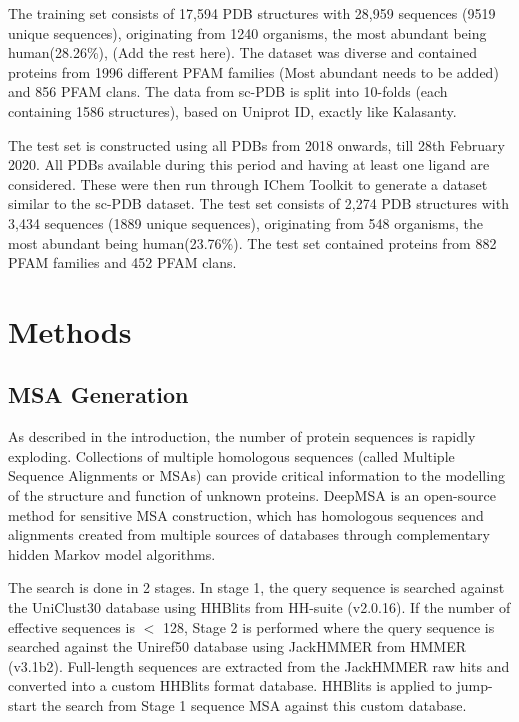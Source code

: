 \documentclass[journal=jacsat,manuscript=article]{achemso}
\begin{document}
The training set consists of 17,594 PDB structures with 28,959 sequences (9519 unique sequences), originating from 1240 organisms, the most abundant being human(28.26\%), (Add the rest here). The dataset was diverse and contained proteins from 1996 different PFAM families (Most abundant needs to be added) and 856 PFAM clans. The data from sc-PDB is split into 10-folds (each containing 1586 structures), based on Uniprot ID, exactly like Kalasanty\cite{stepniewska2020improving}.

The test set is constructed using all PDBs from 2018 onwards, till 28th February 2020. All PDBs available during this period and having at least one ligand are considered. These were then run through IChem Toolkit \cite{da2018ichem} to generate a dataset similar to the sc-PDB dataset. The test set consists of 2,274 PDB structures with 3,434 sequences (1889 unique sequences), originating from 548 organisms, the most abundant being human(23.76\%). The test set contained proteins from 882 PFAM families and 452 PFAM clans.


\section{Methods}
\subsection{MSA Generation}
\quad As described in the introduction, the number of protein sequences is rapidly exploding. Collections of multiple homologous sequences (called Multiple Sequence Alignments or MSAs) can provide critical information to the modelling of the structure and function of unknown proteins. DeepMSA \cite{zhang2020deepmsa} is an open-source method for sensitive MSA construction, which has homologous sequences and alignments created from multiple sources of databases through complementary hidden Markov model algorithms.

The search is done in 2 stages. In stage 1, the query sequence is searched against the UniClust30 \cite{mirdita2017uniclust} database using HHBlits from HH-suite\cite{remmert2012hhblits} (v2.0.16). If the number of effective sequences is $<$ 128, Stage 2 is performed where the query sequence is searched against the Uniref50 \cite{suzek2015uniref} database using JackHMMER from HMMER \cite{johnson2010hidden} (v3.1b2). Full-length sequences are extracted from the JackHMMER raw hits and converted into a custom HHBlits format database. HHBlits is applied to jump-start the search from Stage 1 sequence MSA against this custom database.
\end{document}
